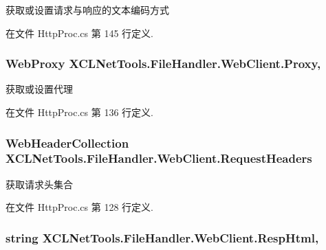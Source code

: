 获取或设置请求与响应的文本编码方式 



在文件 Http\-Proc.\-cs 第 145 行定义.

\hypertarget{class_x_c_l_net_tools_1_1_file_handler_1_1_web_client_ac2f17eefdc2372eb01a6be915d19c0ba}{
\subsubsection[{Proxy}]{\setlength{\rightskip}{0pt plus 5cm}Web\-Proxy X\-C\-L\-Net\-Tools.\-File\-Handler.\-Web\-Client.\-Proxy\hspace{0.3cm}{\ttfamily [get]}, {\ttfamily [set]}}}\label{class_x_c_l_net_tools_1_1_file_handler_1_1_web_client_ac2f17eefdc2372eb01a6be915d19c0ba}


获取或设置代理 



在文件 Http\-Proc.\-cs 第 136 行定义.

\hypertarget{class_x_c_l_net_tools_1_1_file_handler_1_1_web_client_a89d4bf2af70a2a0991904b1b61c8dd1d}{
\subsubsection[{Request\-Headers}]{\setlength{\rightskip}{0pt plus 5cm}Web\-Header\-Collection X\-C\-L\-Net\-Tools.\-File\-Handler.\-Web\-Client.\-Request\-Headers\hspace{0.3cm}{\ttfamily [get]}}}\label{class_x_c_l_net_tools_1_1_file_handler_1_1_web_client_a89d4bf2af70a2a0991904b1b61c8dd1d}


获取请求头集合 



在文件 Http\-Proc.\-cs 第 128 行定义.

\hypertarget{class_x_c_l_net_tools_1_1_file_handler_1_1_web_client_a67e90e96bd067171c16cb84d75f66c3a}{
\subsubsection[{Resp\-Html}]{\setlength{\rightskip}{0pt plus 5cm}string X\-C\-L\-Net\-Tools.\-File\-Handler.\-Web\-Client.\-Resp\-Html\hspace{0.3cm}{\ttfamily [get]}, {\ttfamily [set]}}}\label{class_x_c_l_net_tools_1_1_file_handler_1_1_web_client_a67e90e96bd067171c16cb84d75f66c3a}


